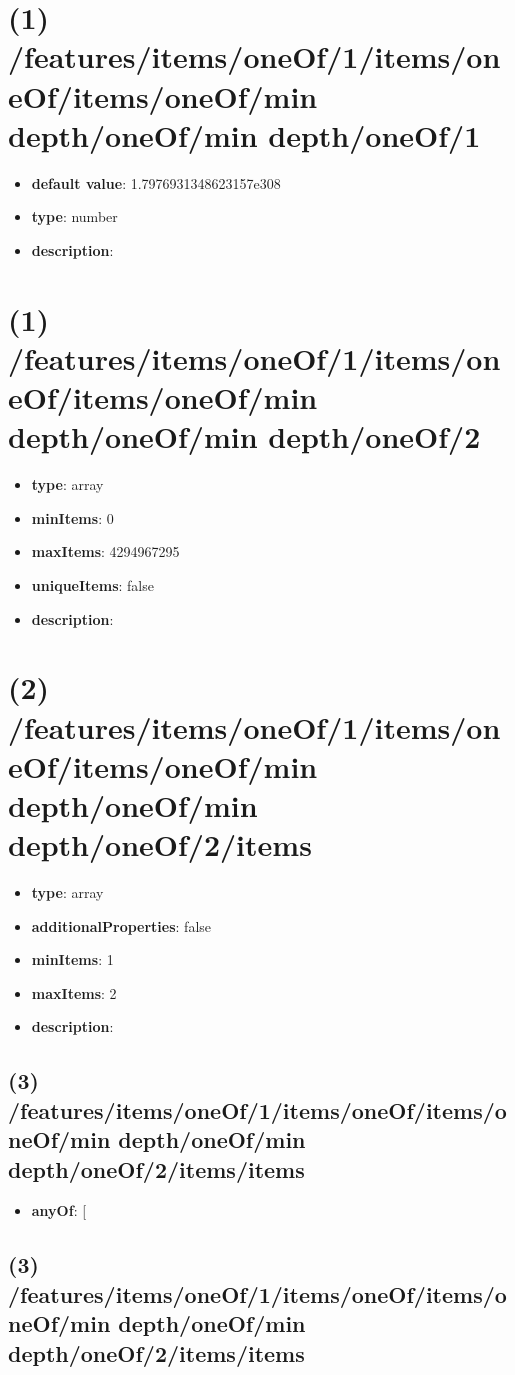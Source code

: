 \section{(1) /features/items/oneOf/1/items/oneOf/items/oneOf/min depth/oneOf/min depth/oneOf/1}
\begin{itemize}[leftmargin=1em]\item {\bf default value}: 1.7976931348623157e308
\item {\bf type}: number
\item {\bf description}: 
\end{itemize}\section{(1) /features/items/oneOf/1/items/oneOf/items/oneOf/min depth/oneOf/min depth/oneOf/2}
\begin{itemize}[leftmargin=1em]\item {\bf type}: array
\item {\bf minItems}: 0
\item {\bf maxItems}: 4294967295
\item {\bf uniqueItems}: false
\item {\bf description}: 
\end{itemize}\section{(2) /features/items/oneOf/1/items/oneOf/items/oneOf/min depth/oneOf/min depth/oneOf/2/items}
\begin{itemize}[leftmargin=2em]\item {\bf type}: array
\item {\bf additionalProperties}: false
\item {\bf minItems}: 1
\item {\bf maxItems}: 2
\item {\bf description}: 
\end{itemize}\subsection{(3) /features/items/oneOf/1/items/oneOf/items/oneOf/min depth/oneOf/min depth/oneOf/2/items/items}
\begin{itemize}[leftmargin=3em]\item {\bf anyOf}: [\end{itemize}\subsection{(3) /features/items/oneOf/1/items/oneOf/items/oneOf/min depth/oneOf/min depth/oneOf/2/items/items}
